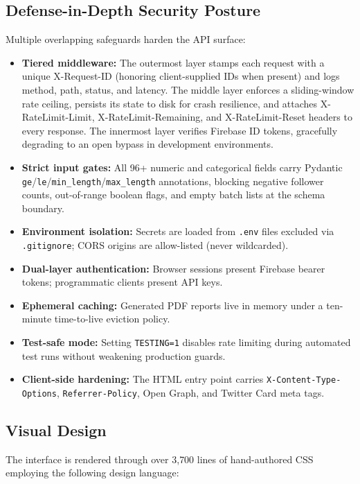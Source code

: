 \documentclass[conference]{IEEEtran}
\begin{document}
\subsection{Defense-in-Depth Security Posture}

Multiple overlapping safeguards harden the API surface:

\begin{itemize}
    \item \textbf{Tiered middleware:} The outermost layer stamps each request with a unique X-Request-ID (honoring client-supplied IDs when present) and logs method, path, status, and latency. The middle layer enforces a sliding-window rate ceiling, persists its state to disk for crash resilience, and attaches X-RateLimit-Limit, X-RateLimit-Remaining, and X-RateLimit-Reset headers to every response. The innermost layer verifies Firebase ID tokens, gracefully degrading to an open bypass in development environments.
    \item \textbf{Strict input gates:} All 96+ numeric and categorical fields carry Pydantic \texttt{ge}/\texttt{le}/\texttt{min\_length}/\texttt{max\_length} annotations, blocking negative follower counts, out-of-range boolean flags, and empty batch lists at the schema boundary.
    \item \textbf{Environment isolation:} Secrets are loaded from \texttt{.env} files excluded via \texttt{.gitignore}; CORS origins are allow-listed (never wildcarded).
    \item \textbf{Dual-layer authentication:} Browser sessions present Firebase bearer tokens; programmatic clients present API keys.
    \item \textbf{Ephemeral caching:} Generated PDF reports live in memory under a ten-minute time-to-live eviction policy.
    \item \textbf{Test-safe mode:} Setting \texttt{TESTING=1} disables rate limiting during automated test runs without weakening production guards.
    \item \textbf{Client-side hardening:} The HTML entry point carries \texttt{X-Content-Type-Options}, \texttt{Referrer-Policy}, Open Graph, and Twitter Card meta tags.
\end{itemize}

\subsection{Visual Design}

The interface is rendered through over 3{,}700 lines of hand-authored CSS employing the following design language:
\end{document}
